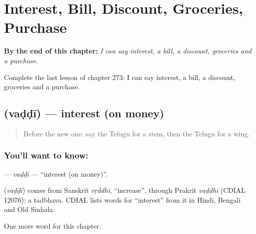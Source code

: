 
\chapter{Interest, Bill, Discount, Groceries, Purchase}
\label{ch:te-interest-bill-discount-groceries-purchase}

\begin{chapteropening}
\textbf{By the end of this chapter:} \emph{I can say interest, a bill, a discount, groceries and a purchase.}

Complete the last lesson of chapter 273: I can say interest, a bill, a discount, groceries and a purchase.
\end{chapteropening}

\section[\texorpdfstring{\te{వడ్డీ} (vaḍḍī)}{వడ్డీ (vaḍḍī)}]{ (vaḍḍī) — interest (on money)}

\label{lesson:TE-C273-vaddi}



\begin{quote}
Before the new one: say the Telugu for a stem, then the Telugu for a wing.
\end{quote}

\subsection*{You'll want to know: }
\textbf{} — \emph{vaḍḍī} — \textquotedblleft{}interest (on money)\textquotedblright{}.

\begin{cousinweb}
\textbf{} (\emph{vaḍḍī}) comes from Sanskrit \emph{vṛddhi}, \textquotedblleft{}increase\textquotedblright{}, through Prakrit \emph{vaḍḍhi} (CDIAL 12076): a tadbhava. CDIAL lists words for \textquotedblleft{}interest\textquotedblright{} from it in Hindi, Bengali and Old Sinhala.
\end{cousinweb}

\begin{grammarlens}[title={What you've built}]
One more word for this chapter.
\end{grammarlens}


